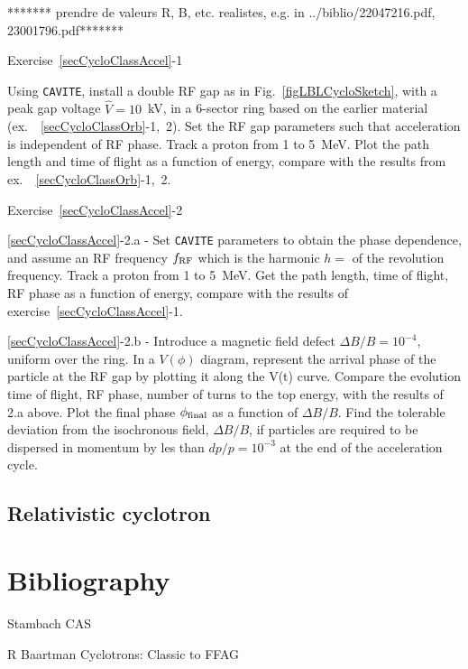  ******* prendre de valeurs R, B, etc. realistes, e.g. in ../biblio/22047216.pdf, 23001796.pdf*******

\smallskip
\noindent {\small $\bullet$} Exercise~\ref{secCycloClassAccel}-1 

Using \texttt{CAVITE}, install a double RF gap as in Fig.~\ref{figLBLCycloSketch}, 
with a peak gap voltage $\hat V = 10$~kV, in a 6-sector ring based on the earlier material (ex.~~\ref{secCycloClassOrb}-1,~2). 
Set the RF gap parameters such that acceleration is independent of RF phase.
Track a proton from 1 to 5~MeV. Plot the path length and time of flight as a function of energy, 
compare with the results from ex.~~\ref{secCycloClassOrb}-1,~2.


\smallskip
\noindent {\small $\bullet$} Exercise~\ref{secCycloClassAccel}-2 

\noindent \ref{secCycloClassAccel}-2.a - 
Set \texttt{CAVITE} parameters to obtain the phase dependence, 
and assume an RF frequency $f_{\rm RF}$ which is the harmonic $h=$ of the revolution frequency.
Track a proton from 1 to 5~MeV. 
Get the path length, time of flight, RF phase as a function of energy,
compare with the results of exercise~\ref{secCycloClassAccel}-1.

\noindent \ref{secCycloClassAccel}-2.b - 
Introduce a magnetic field defect $\Delta B/B= 10^{-4}$, uniform over the ring. 
In a $V(\phi)$ diagram, represent  the arrival phase  of the particle at the RF gap
by plotting it along the V(t) curve. 
Compare the evolution time of flight, RF phase, number of turns to the top energy,
 with the results of 2.a above.
 Plot the final phase $\phi_{\rm final}$ as a function of $\Delta B/B$. 
 Find the tolerable deviation from the isochronous field, 
$\Delta B/B$,  if particles are required to be dispersed in momentum by les 
than $dp/p=10^{-3}$ at the end of the acceleration cycle.




\subsection{Relativistic cyclotron}




\section{Bibliography \label{SecBiblioCyclotron}}

Stambach CAS

R Baartman Cyclotrons: Classic to FFAG

